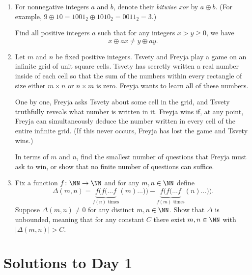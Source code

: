 \documentclass[11pt]{scrartcl}
\begin{document}
\begin{enumerate}[\bfseries 1.]
\item %
For nonnegative integers $a$ and $b$,
denote their \emph{bitwise xor} by $a \oplus b$.
(For example, $9 \oplus 10 = 1001_2 \oplus 1010_2 = 0011_2 = 3$.)

Find all positive integers $a$ such that
for any integers $x > y \ge 0$, we have
\[ x \oplus ax \neq y \oplus ay.  \]

\item %
Let $m$ and $n$ be fixed positive integers.
Tsvety and Freyja play a game on an infinite grid of unit square cells.
Tsvety has secretly written a real number inside of each cell so that
the sum of the numbers within every rectangle of size
either $m \times n$ or $n \times m$ is zero.
Freyja wants to learn all of these numbers.

One by one, Freyja asks Tsvety about some cell in the grid,
and Tsvety truthfully reveals what number is written in it.
Freyja wins if, at any point, Freyja can simultaneously deduce
the number written in every cell of the entire infinite grid.
(If this never occurs, Freyja has lost the game and Tsvety wins.)

In terms of $m$ and $n$, find the smallest number of
questions that Freyja must ask to win,
or show that no finite number of questions can suffice.

\item %
Fix a function $f \colon \NN \to \NN$ and for any $m,n \in \NN$ define
\[
  \Delta(m,n) =
  \underbrace{f(f(\dots f}_{f(n)\text{ times}} (m)\dots)) %
  - \underbrace{f(f(\dots f}_{f(m)\text{ times}} (n)\dots)) %
  .
\]
Suppose $\Delta(m,n) \neq 0$ for any distinct $m,n \in \NN$.
Show that $\Delta$ is unbounded, meaning that for any constant $C$
there exist $m,n \in \NN$
with $\left\lvert \Delta(m,n) \right\rvert > C$.

\end{enumerate}
\pagebreak

\section{Solutions to Day 1}
\end{document}
